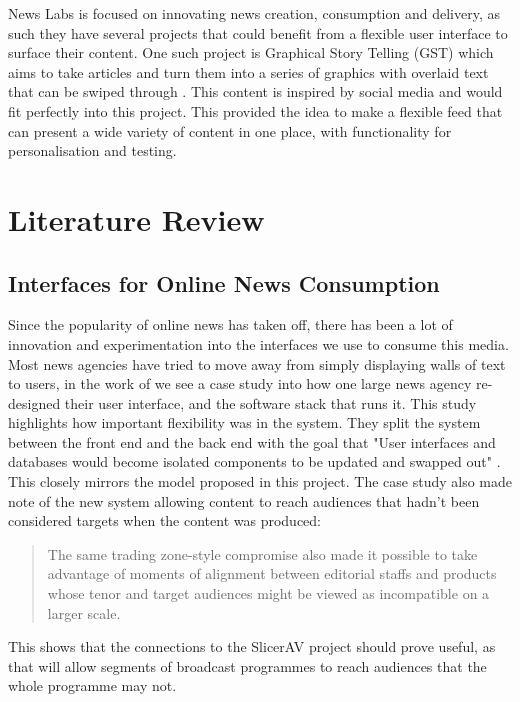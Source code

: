 \documentclass[12pt,titlepage]{article}
\begin{document}
  News Labs is focused on innovating news creation, consumption and delivery, as
  such they have several projects that could benefit from a flexible user
  interface to surface their content. One such project is Graphical Story
  Telling (GST) which aims to take articles and turn them into a series of
  graphics with overlaid text that can be swiped through \citep{gst}. This
  content is inspired by social media and would fit perfectly into this project.
  This provided the idea to make a flexible feed that can present a wide variety
  of content in one place, with functionality for personalisation and testing.

\section{Literature Review}

  \subsection{Interfaces for Online News Consumption}

  Since the popularity of online news has taken off, there has been a lot of
  innovation and experimentation into the interfaces we use to consume this
  media. Most news agencies have tried to move away from simply displaying walls
  of text to users, in the work of \cite{msnbc} we see a case study into how one
  large news agency re-designed their user interface, and the software stack
  that runs it. This study highlights how important flexibility was in the
  system. They split the system between the front end and the back end with the
  goal that "User interfaces and databases would become isolated components to
  be updated and swapped out" \citep{msnbc}. This closely mirrors the model
  proposed in this project. The case study also made note of the new system
  allowing content to reach audiences that hadn't been considered targets when
  the content was produced:

  \begin{quote}
    The same trading zone-style compromise also made it possible to take advantage
    of moments of alignment between editorial staffs and products whose tenor and
    target audiences might be viewed as incompatible on a larger scale.
  \end{quote}

  This shows that the connections to the SlicerAV project should prove useful,
  as that will allow segments of broadcast programmes to reach audiences that
  the whole programme may not.
\end{document}
